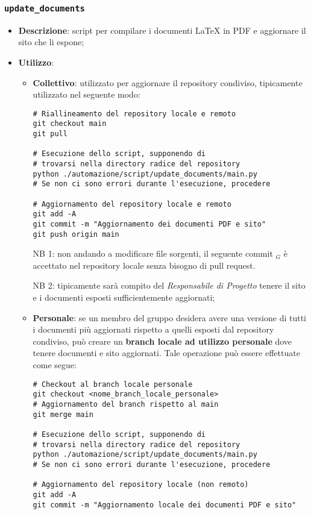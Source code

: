 \subsubsection{\texttt{update\_documents}}
\begin{itemize}
    \item \textbf{Descrizione}: script per compilare i documenti \LaTeX{} in PDF e aggiornare il sito che li espone;
    \item \textbf{Utilizzo}:
    \begin{itemize}
        \item \textbf{Collettivo}: utilizzato per aggiornare il repository condiviso, tipicamente utilizzato nel seguente modo:
\begin{Verbatim}[fontsize=\small]
# Riallineamento del repository locale e remoto
git checkout main
git pull

# Esecuzione dello script, supponendo di
# trovarsi nella directory radice del repository
python ./automazione/script/update_documents/main.py
# Se non ci sono errori durante l'esecuzione, procedere

# Aggiornamento del repository locale e remoto
git add -A
git commit -m "Aggiornamento dei documenti PDF e sito"
git push origin main
\end{Verbatim}

        NB 1: non andando a modificare file sorgenti, il seguente commit $_G$ è accettato nel repository locale senza bisogno di pull request.

        NB 2: tipicamente sarà compito del \textit{Responsabile di Progetto} tenere il sito e i documenti esposti sufficientemente aggiornati;

        \item \textbf{Personale}: se un membro del gruppo desidera avere una versione di tutti i documenti più aggiornati rispetto a quelli esposti dal repository condiviso, può creare un \textbf{branch locale ad utilizzo personale} dove tenere documenti e sito aggiornati. Tale operazione può essere effettuate come segue:
\begin{Verbatim}[fontsize=\small]
# Checkout al branch locale personale
git checkout <nome_branch_locale_personale>
# Aggiornamento del branch rispetto al main
git merge main

# Esecuzione dello script, supponendo di
# trovarsi nella directory radice del repository
python ./automazione/script/update_documents/main.py
# Se non ci sono errori durante l'esecuzione, procedere

# Aggiornamento del repository locale (non remoto)
git add -A
git commit -m "Aggiornamento locale dei documenti PDF e sito"
\end{Verbatim}
    \end{itemize}
\end{itemize}


